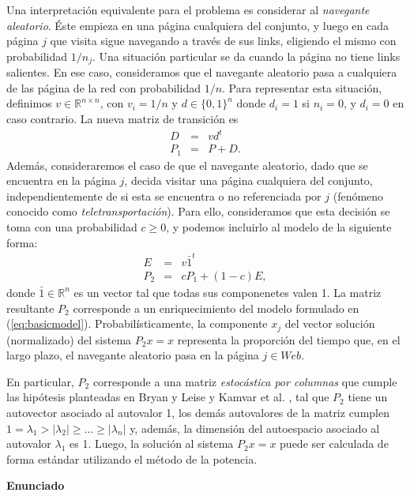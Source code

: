 \documentclass[11pt, a4paper]{article}
\begin{document}
Una interpretaci\'on equivalente para el problema es considerar al \emph{navegante aleatorio}. \'Este empieza en una
p\'agina cualquiera del conjunto, y luego en cada p\'agina $j$ que visita sigue navegando a trav\'es de sus links,
eligiendo el mismo con probabilidad $1/n_j$. Una situaci\'on particular se da cuando la p\'agina no tiene links salientes. En
ese caso, consideramos que el navegante aleatorio pasa a cualquiera de las p\'agina de la red con probabilidad $1/n$.
Para representar esta situaci\'on, definimos $v \in \mathbb{R}^{n \times n}$, con $v_i = 1/n$ y $d \in \{0,1\}^{n}$ donde 
$d_i = 1$ si $n_i = 0$, y $d_i = 0$ en caso contrario. La nueva matriz de transici\'on es 
\begin{eqnarray*}
D & = & v d^t \\
P_1 & = & P + D.
\end{eqnarray*}
Adem\'as, consideraremos el caso de que el navegante aleatorio, dado que se encuentra en la p\'agina $j$, decida visitar
una p\'agina cualquiera del conjunto, independientemente de si esta se encuentra o no referenciada por $j$ (fen\'omeno
conocido como \emph{teletransportaci\'on}). Para ello, consideramos que esta decisi\'on se toma con una probabilidad
$c \ge 0$, y podemos incluirlo al modelo de la siguiente forma:
\begin{eqnarray*}
E & = & v \bar{1}^t \\
P_2 & = & cP_1 + (1-c)E,
\end{eqnarray*}
\noindent donde $\bar{1} \in \mathbb{R}^n$ es un vector tal que todas sus componenetes valen 1. La matriz resultante
$P_2$ corresponde a un enriquecimiento del modelo formulado en (\ref{eq:basicmodel}). Probabil\'isticamente, la
componente $x_j$ del vector soluci\'on (normalizado) del sistema $P_2 x = x$ representa la proporci\'on del tiempo que,
en el largo plazo, el navegante aleatorio pasa en la p\'agina $j \in Web$.

En particular, $P_2$ corresponde a una
matriz \emph{estoc\'astica por columnas} que cumple las hip\'otesis planteadas en Bryan y Leise \cite{Bryan2006} y
Kamvar et al. \cite{Kamvar2003}, tal que $P_2$ tiene un autovector asociado al autovalor 1, los dem\'as autovalores de
la matriz cumplen $1 = \lambda_1 > |\lambda_2| \ge \dots \ge |\lambda_n|$ y, adem\'as, la dimensi\'on
del autoespacio asociado al autovalor $\lambda_1$ es 1. Luego, la soluci\'on al sistema $P_2 x = x$ puede ser calculada
de forma est\'andar utilizando el m\'etodo de la potencia.

\textbf{Enunciado}
\end{document}
